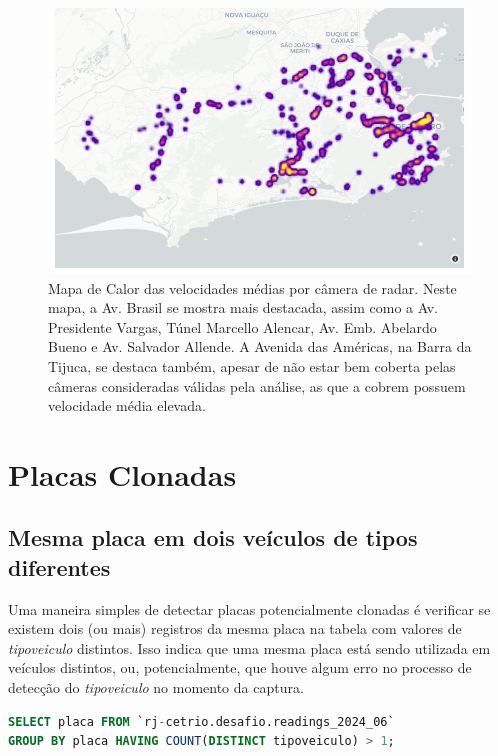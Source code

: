 \documentclass{article}
\begin{document}
\begin{figure}
    \centering
    \includegraphics[width=1\linewidth]{heatmapVelocityFinal.png}
    \caption{Mapa de Calor das velocidades médias por câmera de radar. Neste mapa, a Av. Brasil se mostra mais destacada, assim como a Av. Presidente Vargas, Túnel Marcello Alencar, Av. Emb. Abelardo Bueno e Av. Salvador Allende. A Avenida das Américas, na Barra da Tijuca, se destaca também, apesar de não estar bem coberta pelas câmeras consideradas válidas pela análise, as que a cobrem possuem velocidade média elevada.}
    \label{fig:heatmapAvgVelocity}
\end{figure}


\section{Placas Clonadas}

\subsection{Mesma placa em dois veículos de tipos diferentes}

Uma maneira simples de detectar placas potencialmente clonadas é verificar se existem dois (ou mais) registros da mesma placa na tabela com valores de \textit{tipoveiculo} distintos. Isso indica que uma mesma placa está sendo utilizada em veículos distintos, ou, potencialmente, que houve algum erro no processo de detecção do \textit{tipoveiculo} no momento da captura. 

\begin{lstlisting}[language=SQL,caption={Query SQL para identificar inconsistências de placa com tipo de veículo. São retornadas todas as placas as quais existem dois (ou mais) registros na tabela com valores de \textit{tipoveiculo} distintos.},label={lst:sqlquery5}]
SELECT placa FROM `rj-cetrio.desafio.readings_2024_06`
GROUP BY placa HAVING COUNT(DISTINCT tipoveiculo) > 1;
\end{lstlisting}
\end{document}
